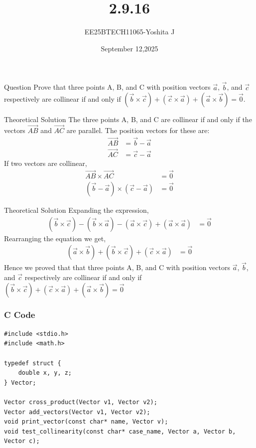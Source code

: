 \documentclass{beamer}
\begin{document}
\title 
{2.9.16}
\date{September 12,2025}


\author 
{EE25BTECH11065-Yoshita J}






\frame{\titlepage}
\begin{frame}{Question}
Prove that three points A, B, and C with position vectors $\vec{a}$, $\vec{b}$, and $\vec{c}$ respectively are collinear if and only if $(\vec{b} \times \vec{c}) + (\vec{c} \times \vec{a}) + (\vec{a} \times \vec{b}) = \vec{0}$.\\

\end{frame}

\begin{frame}{Theoretical Solution}
The three points A, B, and C are collinear if and only if the vectors $\vec{AB}$ and $\vec{AC}$ are parallel. The position vectors for these are:
\begin{align*}
    \vec{AB} &= \vec{b} - \vec{a} \\
    \vec{AC} &= \vec{c} - \vec{a}
\end{align*}
If two vectors are collinear,
\begin{align}
    \vec{AB} \times \vec{AC} &= \vec{0} \\
    (\vec{b} - \vec{a}) \times (\vec{c} - \vec{a}) &= \vec{0}
\end{align}
\end{frame}

\begin{frame}{Theoretical Solution}
Expanding the expression,
\begin{align}
    (\vec{b} \times \vec{c}) - (\vec{b} \times \vec{a}) - (\vec{a} \times \vec{c}) + (\vec{a} \times \vec{a}) &= \vec{0} \label{eq:expanded}
\end{align}
Rearranging the equation we get,
\begin{align}
    (\vec{a} \times \vec{b}) + (\vec{b} \times \vec{c}) + (\vec{c} \times \vec{a}) &= \vec{0}
\end{align}
Hence we proved that that three points A, B, and C with position vectors $\vec{a}$, $\vec{b}$, and $\vec{c}$ respectively are collinear if and only if $(\vec{b} \times \vec{c}) + (\vec{c} \times \vec{a}) + (\vec{a} \times \vec{b}) = \vec{0}$
\end{frame}

\begin{frame}[fragile]
    \frametitle{C Code}

    \begin{lstlisting}
#include <stdio.h>
#include <math.h>

typedef struct {
    double x, y, z;
} Vector;

Vector cross_product(Vector v1, Vector v2);
Vector add_vectors(Vector v1, Vector v2);
void print_vector(const char* name, Vector v);
void test_collinearity(const char* case_name, Vector a, Vector b, Vector c);

    \end{lstlisting}
\end{frame}
\end{document}
